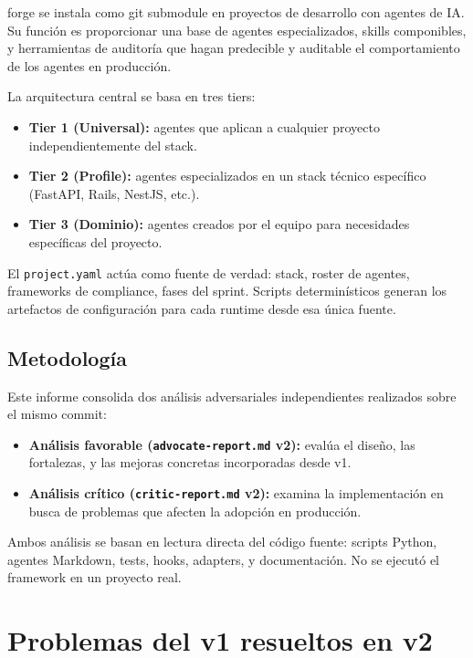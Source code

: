 \documentclass[12pt,a4paper]{article}
\begin{document}
forge se instala como git submodule en proyectos de desarrollo con agentes de IA.
Su funci\'on es proporcionar una base de agentes especializados, skills
componibles, y herramientas de auditor\'ia que hagan predecible y auditable el
comportamiento de los agentes en producci\'on.

La arquitectura central se basa en tres tiers:

\begin{itemize}
  \item \textbf{Tier 1 (Universal):} agentes que aplican a cualquier proyecto
    independientemente del stack.
  \item \textbf{Tier 2 (Profile):} agentes especializados en un stack t\'ecnico
    espec\'ifico (FastAPI, Rails, NestJS, etc.).
  \item \textbf{Tier 3 (Dominio):} agentes creados por el equipo para necesidades
    espec\'ificas del proyecto.
\end{itemize}

El \texttt{project.yaml} act\'ua como fuente de verdad: stack, roster de agentes,
frameworks de compliance, fases del sprint. Scripts determin\'isticos generan los
artefactos de configuraci\'on para cada runtime desde esa \'unica fuente.

\subsection{Metodolog\'ia}

Este informe consolida dos an\'alisis adversariales independientes realizados
sobre el mismo commit:

\begin{itemize}
  \item \textbf{An\'alisis favorable (\texttt{advocate-report.md} v2):} eval\'ua
    el dise\~no, las fortalezas, y las mejoras concretas incorporadas desde v1.
  \item \textbf{An\'alisis cr\'itico (\texttt{critic-report.md} v2):} examina la
    implementaci\'on en busca de problemas que afecten la adopci\'on en
    producci\'on.
\end{itemize}

Ambos an\'alisis se basan en lectura directa del c\'odigo fuente: scripts Python,
agentes Markdown, tests, hooks, adapters, y documentaci\'on. No se ejecut\'o el
framework en un proyecto real.

\section{Problemas del v1 resueltos en v2}
\end{document}
